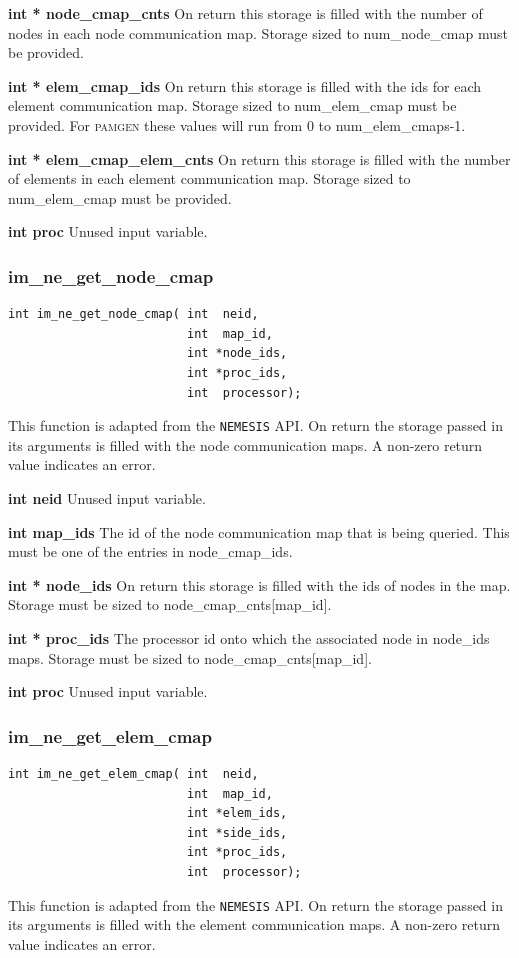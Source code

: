 {\setlength{\parindent}{0pt}
 \textbf{int * node\_cmap\_cnts} On return this storage is filled with the number of nodes in each node communication map. Storage sized to num\_node\_cmap must be provided.}

{\setlength{\parindent}{0pt}
 \textbf{int * elem\_cmap\_ids} On return this storage is filled with the ids for each element communication map. Storage sized to num\_elem\_cmap must be provided. For \textsc{pamgen} these values will run from 0  to num\_elem\_cmaps-1.}

{\setlength{\parindent}{0pt}
 \textbf{int * elem\_cmap\_elem\_cnts} On return this storage is filled with the number of elements in each element communication map. Storage sized to num\_elem\_cmap must be provided. }

{\setlength{\parindent}{0pt}
 \textbf{int proc} Unused input variable.}

\subsubsection{im\_ne\_get\_node\_cmap}
{\ttfamily  \begin{verbatim}
int im_ne_get_node_cmap( int  neid,
                         int  map_id,
                         int *node_ids,
                         int *proc_ids,
                         int  processor);
\end{verbatim}}
This function is adapted from the \texttt{NEMESIS} API. On return the storage passed in its arguments is filled with the node communication maps.  A non-zero return value indicates an error.

{\setlength{\parindent}{0pt}
 \textbf{int neid} Unused input variable.}

{\setlength{\parindent}{0pt}
 \textbf{int map\_ids} The id of the node communication map that is being queried. This must be one of the entries in node\_cmap\_ids.}

{\setlength{\parindent}{0pt}
 \textbf{int * node\_ids} On return this storage is filled with the ids of nodes in the map. Storage must be sized to node\_cmap\_cnts[map\_id]. }

{\setlength{\parindent}{0pt}
 \textbf{int * proc\_ids} The processor id onto which the associated node in node\_ids maps. Storage must be sized to node\_cmap\_cnts[map\_id].}

{\setlength{\parindent}{0pt}
 \textbf{int proc} Unused input variable.}

\subsubsection{im\_ne\_get\_elem\_cmap}
{\ttfamily  \begin{verbatim}
int im_ne_get_elem_cmap( int  neid,
                         int  map_id,
                         int *elem_ids,
                         int *side_ids,
                         int *proc_ids,
                         int  processor);
\end{verbatim}}
This function is adapted from the \texttt{NEMESIS} API. On return the storage passed in its arguments is filled with the element communication maps.  A non-zero return value indicates an error.

